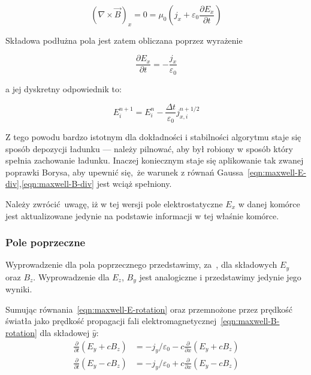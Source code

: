 \begin{equation}
    \left(\nabla \times \vec{B}\right)_x = 0 = \mu_0 \left(j_x + \varepsilon_0 \frac{\partial E_x}{\partial t}\right)
    \label{eqn:longitudinal-field-eq}
 \end{equation}

Składowa podłużna pola jest zatem obliczana poprzez wyrażenie

\begin{equation}
\frac{\partial E_x}{\partial t} = - \frac{j_x}{\varepsilon_0}
\label{longitudinal-field-differential}
\end{equation}

a jej dyskretny odpowiednik to:

\begin{equation}
    E_i^{n+1} = E_i^n - \frac{\Delta t}{\varepsilon_0} j_{x,i}^{n+1/2}
\label{longitudinal-field-finite-differential}
\end{equation}


Z tego powodu bardzo istotnym dla dokładności i stabilności algorytmu staje
się sposób depozycji ładunku --- należy pilnować, aby był robiony w sposób
który spełnia zachowanie ładunku. Inaczej koniecznym staje się aplikowanie
tak zwanej poprawki Borysa, 
aby upewnić się, że warunek z równań Gaussa~\ref{eqn:maxwell-E-div},\ref{eqn:maxwell-B-div}
jest wciąż spełniony.

Należy zwrócić uwagę, iż w tej wersji pole elektrostatyczne $E_x$ w danej komórce jest
aktualizowane jedynie na podstawie informacji w tej właśnie komórce.

\subsubsection{Pole poprzeczne}
Wyprowadzenie dla pola poprzecznego przedstawimy, za~\cite{birdsall}, dla składowych $E_y$ oraz $B_z$. Wyprowadzenie dla $E_z$, $B_y$ jest analogiczne i przedstawimy jedynie jego wyniki.

Sumując równania~\ref{eqn:maxwell-E-rotation} oraz przemnożone przez prędkość światła jako prędkość propagacji fali elektromagnetycznej~\ref{eqn:maxwell-B-rotation} dla składowej $\hat{y}$:
\begin{align}
    \frac{\partial}{\partial t} \left(E_y + c B_z\right) &= - j_y / \varepsilon_0 - c \frac{\partial}{\partial x} \left(E_y + c B_z\right) \\
    \frac{\partial}{\partial t} \left(E_y - c B_z\right) &= - j_y / \varepsilon_0 + c \frac{\partial}{\partial x} \left(E_y - c B_z\right)
\end{align}

